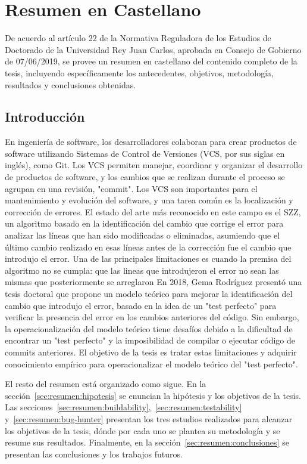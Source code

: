 \chapter{Resumen en Castellano}

De acuerdo al artículo 22 de la Normativa Reguladora de los Estudios de Doctorado de la Universidad Rey Juan Carlos, aprobada en Consejo de Gobierno de 07/06/2019, se provee un resumen en castellano del contenido completo de la tesis, incluyendo específicamente los antecedentes, objetivos, metodología, resultados y conclusiones obtenidas.

\section{Introducción}

En ingeniería de software, los desarrolladores colaboran para crear productos de software utilizando Sistemas de Control de Versiones (VCS, por sus siglas en inglés), como Git. 
Los VCS permiten manejar, coordinar y organizar el desarrollo de productos de software, y los cambios que se realizan durante el proceso se agrupan en una revisión, "commit". 
Los VCS son importantes para el mantenimiento y evolución del software, y una tarea común es la localización y corrección de errores. 
El estado del arte más reconocido en este campo es el SZZ, un algoritmo basado en la identificación del cambio que corrige el error para analizar las líneas que han sido modificadas o eliminadas, asumiendo que el último cambio realizado en esas líneas antes de la corrección fue el cambio que introdujo el error. 
Una de las principales limitaciones es cuando la premisa del algoritmo no se cumpla: que las lineas que introdujeron el error no sean
las mismas que posteriormente se arreglaron
En 2018, Gema Rodríguez presentó una tesis doctoral que propone un modelo teórico para mejorar la identificación del cambio que introdujo el error, basado en la idea de un "test perfecto" para verificar la presencia del error en los cambios anteriores del código. 
Sin embargo, la operacionalización del modelo teórico tiene desafíos debido a la dificultad de encontrar un "test perfecto" y la imposibilidad de compilar o ejecutar código de commits anteriores. 
El objetivo de la tesis es tratar estas limitaciones y adquirir conocimiento empírico para operacionalizar el modelo teórico del "test perfecto".

El resto del resumen está organizado como sigue. En la sección~\ref{sec:resumen:hipotesis} se enuncian la hipótesis y los objetivos de la tesis. 
Las secciones~\ref{sec:resumen:buildability},~\ref{sec:resumen:testability} y~\ref{sec:resumen:bug-hunter} presentan los tres estudios realizados para alcanzar los objetivos de la tesis, dónde por cada uno se plantea su metodología y se resume sus resultados.
Finalmente, en la sección~\ref{sec:resumen:conclusiones} se presentan las conclusiones y los trabajos futuros. 

